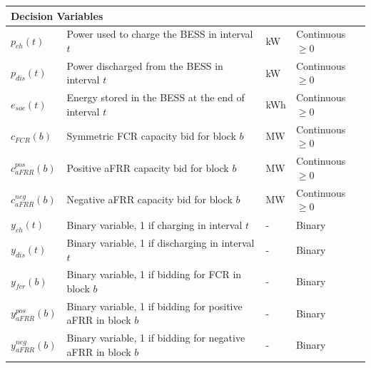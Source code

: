 \begin{table}[h!]
\begin{tabularx}{0.8\textwidth}{|X|X|X|X|}
\hline
\multicolumn{4}{|l|}{\textbf{Decision Variables}} \\
\hline
$p_{ch}(t)$ & Power used to charge the BESS in interval $t$ & kW & Continuous $\geq 0$ \\
\hline
$p_{dis}(t)$ & Power discharged from the BESS in interval $t$ & kW & Continuous $\geq 0$ \\
\hline
$e_{soc}(t)$ & Energy stored in the BESS at the end of interval $t$ & kWh & Continuous $\geq 0$ \\
\hline
$c_{FCR}(b)$ & Symmetric FCR capacity bid for block $b$ & MW & Continuous $\geq 0$ \\
\hline
$c_{aFRR}^{pos}(b)$ & Positive aFRR capacity bid for block $b$ & MW & Continuous $\geq 0$ \\
\hline
$c_{aFRR}^{neg}(b)$ & Negative aFRR capacity bid for block $b$ & MW & Continuous $\geq 0$ \\
\hline
$y_{ch}(t)$ & Binary variable, 1 if charging in interval $t$ & - & Binary \\
\hline
$y_{dis}(t)$ & Binary variable, 1 if discharging in interval $t$ & - & Binary \\
\hline
$y_{fcr}(b)$ & Binary variable, 1 if bidding for FCR in block $b$ & - & Binary \\
\hline
$y_{aFRR}^{pos}(b)$ & Binary variable, 1 if bidding for positive aFRR in block $b$ & - & Binary \\
\hline
$y_{aFRR}^{neg}(b)$ & Binary variable, 1 if bidding for negative aFRR in block $b$ & - & Binary \\
\hline
\end{tabularx}
\end{table}




